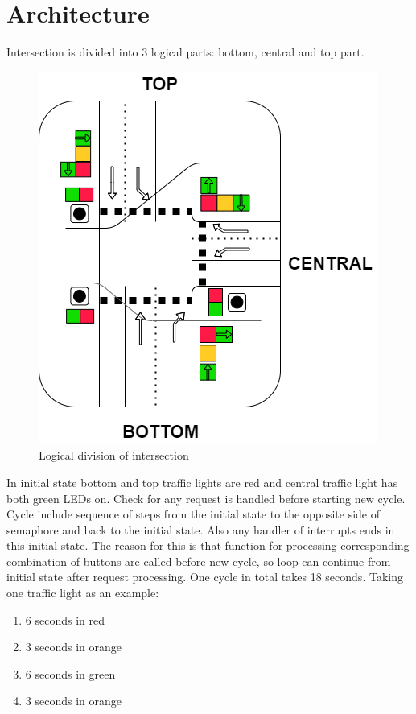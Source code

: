 \documentclass[12pt,a4paper]{article}
\begin{document}
    \section{Architecture}
    Intersection is divided into 3 logical parts: bottom, central and top part.
    \begin{figure}[h!]
        \centering
        \includegraphics[scale=0.5]{images/semaphore.png}
        \caption{Logical division of intersection}
        \label{fig:my_label}
    \end{figure}
    
    \noindent In initial state bottom and top traffic lights are red and central traffic light has both green LEDs on.
    Check for any request is handled before starting new cycle.
    Cycle include sequence of steps from the initial state to the opposite side of semaphore and back to the initial state.
    Also any handler of interrupts ends in this initial state.
    The reason for this is that function for processing corresponding combination of buttons are called before new cycle, so loop can continue from initial state after request processing.
    One cycle in total takes 18 seconds.
    Taking one traffic light as an example:
    \begin{enumerate}
        \item 6 seconds in red
        \item 3 seconds in orange
        \item 6 seconds in green
        \item 3 seconds in orange
    \end{enumerate}
\end{document}
